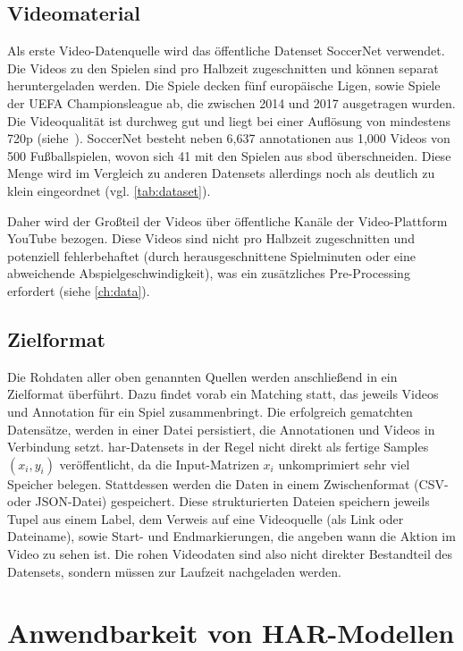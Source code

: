 \subsection{Videomaterial}
\label{subsec:videomaterial}

Als erste Video-Datenquelle wird das öffentliche Datenset SoccerNet verwendet.
Die Videos zu den Spielen sind pro Halbzeit zugeschnitten und können separat heruntergeladen werden.
Die Spiele decken fünf europäische Ligen, sowie Spiele der UEFA Championsleague ab, die zwischen 2014 und 2017 ausgetragen wurden.
Die Videoqualität ist durchweg gut und liegt bei einer Auflösung von mindestens 720p (siehe~\cite{SoccerNet20}).
SoccerNet besteht neben 6,637 \gls{annotationen} aus 1,000 Videos von 500 Fußballspielen, wovon sich 41 mit den Spielen aus \gls{sbod} überschneiden.
Diese Menge wird im Vergleich zu anderen Datensets allerdings noch als deutlich zu klein eingeordnet (vgl. \autoref{tab:dataset}).

Daher wird der Großteil der Videos über öffentliche Kanäle der Video-Plattform YouTube bezogen.
Diese Videos sind nicht pro Halbzeit zugeschnitten und potenziell fehlerbehaftet (\zB durch herausgeschnittene Spielminuten oder eine abweichende Abspielgeschwindigkeit), was ein zusätzliches Pre-Processing erfordert (siehe \autoref{ch:data}).

\subsection{Zielformat}
\label{subsec:zielformat}

Die Rohdaten aller oben genannten Quellen werden anschließend in ein Zielformat überführt.
Dazu findet vorab ein Matching statt, das jeweils Videos und Annotation für ein Spiel zusammenbringt.
Die erfolgreich gematchten Datensätze, werden in einer Datei persistiert, die Annotationen und Videos in Verbindung setzt.
\gls{har}-Datensets in der Regel nicht direkt als fertige Samples $(x_i, y_i)$ veröffentlicht, da die Input-Matrizen $x_i$ unkomprimiert sehr viel Speicher belegen.
Stattdessen werden die Daten in einem Zwischenformat (\zB CSV- oder JSON-Datei) gespeichert.
Diese strukturierten Dateien speichern jeweils Tupel aus einem Label, dem Verweis auf eine Videoquelle (als Link oder Dateiname), sowie Start- und Endmarkierungen, die angeben wann die Aktion im Video zu sehen ist.
Die rohen Videodaten sind also nicht direkter Bestandteil des Datensets, sondern müssen zur Laufzeit nachgeladen werden.

\section{Anwendbarkeit von HAR-Modellen}
\label{sec:decisions}

